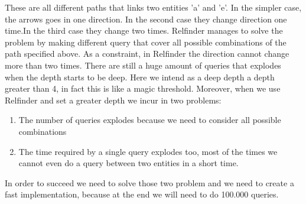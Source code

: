 These are all different paths that links two entities 'a' and 'e'. In the simpler case, the arrows goes in one direction. In the second case they change direction one time.In the third case they change two times.
Relfinder manages to solve the problem by making different query that cover all possible combinations of the path specified above. As a constraint, in Relfinder the direction cannot change more than two times. There are still a huge amount of queries that explodes when the depth starts to be deep.
Here we intend as a deep depth a depth greater than 4, in fact this is like a magic threshold. 
Moreover, when we use Relfinder and set a greater depth we incur in two problems: 
\begin{enumerate}
\item The number of queries explodes because we need to consider all possible combinations
\item The time required by a single query explodes too, most of the times we cannot even do a query between two entities in a short time.
\end{enumerate}
In order to succeed we need to solve those two problem and we need to create a fast implementation, because at the end we will need to do 100.000 queries. 
